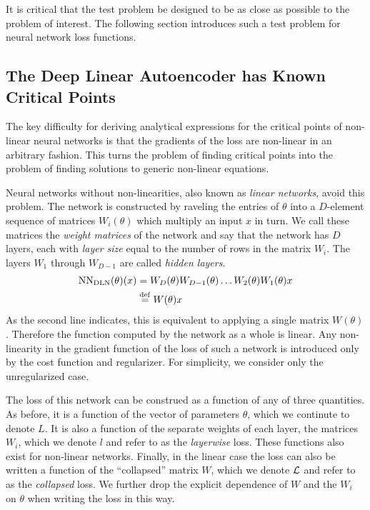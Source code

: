 \documentclass[../../thesis.tex]{subfiles}
\begin{document}
It is critical that the test problem be designed
to be as close as possible to the problem of interest.
The following section introduces such a test problem for
neural network loss functions.

\subsection{The Deep Linear Autoencoder has Known Critical Points}%

The key difficulty for deriving analytical expressions
for the critical points of non-linear neural networks
is that the gradients of the loss are non-linear
in an arbitrary fashion.
This turns the problem of finding critical points
into the problem of finding solutions to generic non-linear equations.

Neural networks without non-linearities,
also known as \emph{linear networks},
avoid this problem.
The network is constructed by raveling the entries of $\theta$
into a $D$-element sequence of matrices $W_i(\theta)$
which multiply an input $x$ in turn.
We call these matrices the \emph{weight matrices}
of the network and say that the network has $D$ layers,
each with \emph{layer size} equal to the number of rows
in the matrix $W_i$.
The layers $W_1$ through $W_{D-1}$ are called \emph{hidden layers}.
\begin{align}
	\mathrm{NN}_{\mathrm{DLN}}(\theta)(x)
	&= W_D(\theta) W_{D-1}(\theta) \dots W_{2}(\theta) W_{1}(\theta) x\\
	&\stackrel{\small \mathrm{def}}{=}{W(\theta) x}
\end{align}
\noindent As the second line indicates,
this is equivalent to applying
a single matrix $W(\theta)$.
Therefore the function computed by the network as a whole is linear.
Any non-linearity in the gradient function
of the loss of such a network is introduced
only by the cost function and regularizer.
For simplicity, we consider only the unregularized case.

The loss of this network can be construed as a function
of any of three quantities.
As before, it is a function of the vector of parameters $\theta$,
which we continute to denote $L$.
It is also a function of the separate weights of each layer,
the matrices $W_i$,
which we denote $l$
and refer to as the \emph{layerwise} loss.
These functions also exist for non-linear networks.
Finally, in the linear case
the loss can also be written a function
of the \enquote{collapsed} matrix $W$,
which we denote ${\mathcal{L}}$
and refer to as the \emph{collapsed} loss.
We further drop the explicit dependence of $W$
and the $W_i$ on $\theta$ when writing the loss in this way.
\end{document}

